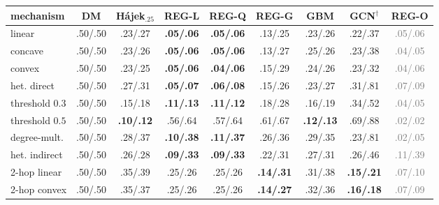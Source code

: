 \footnotesize\setlength{\tabcolsep}{3.2pt}
\begin{tabular}{lcccccccc}
\toprule
mechanism & DM & H\'ajek$_{.25}$ & REG-L & REG-Q & REG-G & GBM & GCN$^{\dagger}$ & REG-O \\
\midrule
linear & .50/.50 & .23/.27 & \textbf{.05/.06} & \textbf{.05/.06} & .13/.25 & .23/.26 & .22/.37 & \textcolor{gray}{.05/.06} \\
concave & .50/.50 & .23/.26 & \textbf{.05/.06} & \textbf{.05/.06} & .13/.27 & .25/.26 & .23/.38 & \textcolor{gray}{.04/.05} \\
convex & .50/.50 & .23/.25 & \textbf{.05/.06} & \textbf{.04/.06} & .15/.29 & .24/.26 & .23/.32 & \textcolor{gray}{.04/.06} \\
het. direct & .50/.50 & .27/.31 & \textbf{.05/.07} & \textbf{.06/.08} & .15/.26 & .23/.27 & .31/.81 & \textcolor{gray}{.07/.09} \\
threshold $0.3$ & .50/.50 & .15/.18 & \textbf{.11/.13} & \textbf{.11/.12} & .18/.28 & .16/.19 & .34/.52 & \textcolor{gray}{.04/.05} \\
threshold $0.5$ & .50/.50 & \textbf{.10/.12} & .56/.64 & .57/.64 & .61/.67 & \textbf{.12/.13} & .69/.88 & \textcolor{gray}{.02/.02} \\
degree-mult. & .50/.50 & .28/.37 & \textbf{.10/.38} & \textbf{.11/.37} & .26/.36 & .29/.35 & .23/.81 & \textcolor{gray}{.02/.05} \\
het. indirect & .50/.50 & .26/.28 & \textbf{.09/.33} & \textbf{.09/.33} & .22/.31 & .27/.31 & .26/.46 & \textcolor{gray}{.11/.39} \\
2-hop linear & .50/.50 & .35/.39 & .25/.26 & .25/.26 & \textbf{.14/.31} & .31/.38 & \textbf{.15/.21} & \textcolor{gray}{.07/.10} \\
2-hop convex & .50/.50 & .35/.37 & .25/.26 & .25/.26 & \textbf{.14/.27} & .32/.36 & \textbf{.16/.18} & \textcolor{gray}{.07/.09} \\
\bottomrule
\end{tabular}
